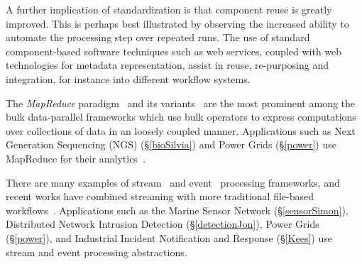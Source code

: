 
A further implication of standardization is that
component reuse is greatly improved. This is perhaps best illustrated
by observing the increased ability to automate the processing step
over repeated runs.  The use of standard component-based software
techniques such as web services, coupled with web technologies for
metadata representation, assist in reuse, re-purposing and
integration, for instance into different workflow systems.

The {\em MapReduce} paradigm~\cite{MapReduce} and its variants~\cite{twister,hmr} are the most prominent among the bulk data-parallel frameworks which use bulk operators to express computations over collections of data in an loosely coupled manner.  Applications such as Next Generation Sequencing (NGS) (\S\ref{bioSilvia}) and Power Grids (\S\ref{power}) use MapReduce for
their analytics~\cite{cloudburst,genometoolkit,Yin:mapreduce:2012}.

There are many examples of stream~\cite{chandrasekaran:telegraphcq2003,
abadi:borealis2005,
liew:streamgraph2010} and event~\cite{ESPER, siddhi,
MicrosoftInsight} processing frameworks, and recent works have
combined streaming with more traditional file-based
workflows~\cite{ZinnCluster,Herath:CCGrid:2010}.  Applications such as
the Marine Sensor Network (\S\ref{sensorSimon}), Distributed Network
Intrusion Detection (\S\ref{detectionJon}), Power Grids
(\S\ref{power}), and Industrial Incident Notification and Response
(\S\ref{Kees}) use stream and event processing abstractions.

